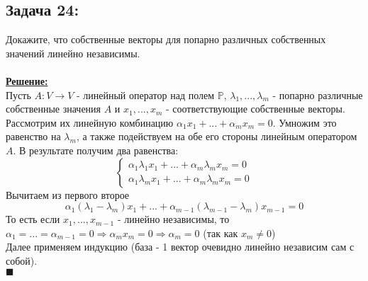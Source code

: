 \documentclass[a4paper,12pt,titlepage,final]{article}
\begin{document}
\subsection*{Задача 24:}
\noindent Докажите, что собственные векторы для попарно различных собственных значений линейно независимы. \\ \\
\textbf{\underline{Решение:}} \\
Пусть $A: V \rightarrow V$ - линейный оператор над полем $\mathbb{P}$, $\lambda_1, ... , \lambda_m$ - попарно различные собственные значения $A$ 
и $x_1, ... , x_m$ - соответствующие собственные векторы. \\
Рассмотрим их линейную комбинацию $\alpha_1 x_1 + ... + \alpha_m x_m = 0$. Умножим это равенство на $\lambda_m$, 
а также подействуем на обе его стороны линейным оператором $A$. В результате получим два равенства: \\
$$
\begin{cases}
    \alpha_1 \lambda_1 x_1 + ... + \alpha_m \lambda_m x_m = 0 \\
    \alpha_1 \lambda_m x_1 + ... + \alpha_m \lambda_m x_m = 0
\end{cases}
$$
Вычитаем из первого второе
$$\alpha_1 (\lambda_1 - \lambda_m)x_1 + ... + \alpha_{m - 1} (\lambda_{m - 1} - \lambda_m)x_{m - 1} = 0$$
То есть если $x_1, ... , x_{m - 1}$ - линейно независимы, то $\alpha_1 = ... = \alpha_{m - 1} = 0 \Rightarrow
\alpha_m x_m = 0 \Rightarrow \alpha_m = 0$ (так как $x_m \neq 0$) \\
Далее применяем индукцию (база - 1 вектор очевидно линейно независим сам с собой). \\ $\blacksquare$ \\ \\ \\


\end{document}

